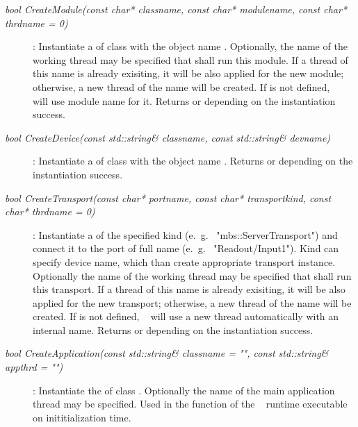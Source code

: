 \begin{description}
	 
\item[\em bool CreateModule\small (const char* classname, const char* modulename, const char* thrdname = 0)] : 
Instantiate a  of class  with the object name
. Optionally, the name of the working thread  may
be specified that shall run this module. If a thread of this name is already exisiting, 
it will be also applied for the new module; otherwise, a new thread of the name
will be created. If  is not defined, \dabc~ will use module name for it.
Returns  or  depending on the instantiation success.

\item[\em bool CreateDevice\small (const std::string& classname, const std::string& devname)]:
Instantiate a  of class  with the object name
. Returns  or  depending on the instantiation success.






\item[\em bool CreateTransport\small (const char* portname, const char* transportkind, const char* thrdname = 0)] :
Instantiate a  of the specified kind  (e.~g.~ "mbs::ServerTransport")
and connect it to the port of full name  (e.~g.~ "Readout/Input1").
Kind can specify device name, which than create appropriate transport instance.
Optionally the name of the working thread
 may
be specified that shall run this transport. If a thread of this name is already exisiting, 
it will be also applied for the new transport; otherwise, a new thread of the name
will be created. If  is not defined, \dabc~ will use a new 
thread automatically with an internal name.
Returns  or  depending on the instantiation success.

  
\item[\em bool CreateApplication\small (const std::string& classname = "", const std::string& appthrd = "")] :
Instantiate the  of class . Optionally
the name  of the main application thread may be specified.
Used in the  function of the \dabc~ runtime executable on
inititialization time.

\end{description}	 


